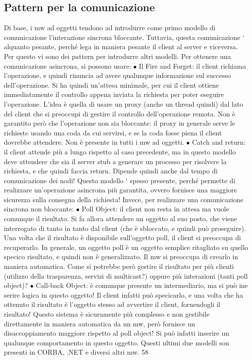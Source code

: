 \subsection{Pattern per la comunicazione}
Di base, i mw ad oggetti tendono ad introdurre come primo modello di comunicazione l'interazione sincrona bloccante.
Tuttavia, questa comunicazione `
alquanto pesante, perché lega in maniera pesante il client al server e viceversa.
Per questo vi sono dei pattern per introdurre altri modelli.
Per ottenere una comunicazione asincrona, si possono usare:
$\bullet$ Il Fire and Forget: il client richiama l'operazione, e quindi rinuncia ad
avere qualunque informazione sul successo dell'operazione. Si ha quindi
un'attesa minimale, per cui il client ottiene immediatamente il controllo
appena inviata la richiesta per poter eseguire l'operazione. L'idea è quella
di usare un proxy (anche un thread quindi) dal lato del client che si preoccupi di gestire il controllo dell'operazione
remota. Non è garantito però
che l'operazione non sia bloccante: il proxy in generale serve le richieste
usando una coda da cui servirsi, e se la coda fosse piena il client dovrebbe
attendere. Non è presente in tutti i mw ad oggetti.
$\bullet$ Catch and return: il client attende più a lungo rispetto al caso precedente,
ma in questo modello deve attendere che sia il server stub a generare un
processo per risolvere la richiesta, e che quindi faccia return. Dipende
quindi anche dal tempo di comunicazione dei nodi! Questo modello `
spesso presente, perché permette di realizzare un'operazione asincrona
più garantita, ovvero fornisce una maggiore sicurezza sulla consegna della
richiesta!
Invece, per realizzare una comunicazione sincrona non bloccante:
$\bullet$ Poll Object: il client non resta in attesa ma vuole comunque il risultato.
Si fa allora attendere un oggetto al suo posto, che viene interrogato di
tanto in tanto dal client (che è sbloccato, e quindi può proseguire). Una
volta che il risultato è disponibile sull'oggetto poll, il client si preoccupa
di recuperarlo.
In generale, un oggetto poll è un oggetto semplice ritagliato su quello
specico risultato, e quindi non è generalizzato. Il mw si preoccupa di
crearlo in maniera automatica. Come si potrebbe però gestire il risultato
per più clienti (utilizzo della trasparenza, servizi di multicast?) oppure
più interazioni (tanti poll object)?
$\bullet$ Call-back Object: è comunque presente un intermediario, ma si può ine
serire logica in questo oggetto! Il client infatti può specicarlo, e una
volta che ha ottenuto il risultato è l'oggetto stesso ad avvertire il client,
fornendogli il risultato! Questo sistema è sicuramente più complesso e non
gestibile direttamente in maniera automatica da un mw, però fornisce un
disaccoppiamento maggiore rispetto al poll object! Si può infatti inserire
un qualunque comportamento in questo oggetto.
Questi ultimi due modelli son presenti in CORBA, .NET e diversi altri mw.
58
